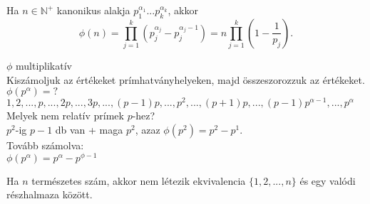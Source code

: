 \documentclass{beamer}
\begin{document}
\begin{frame}

\begin{tcolorbox}[title={Tétel: ${\phi}$(n) kiszámolása}]
Ha $n \in \mathbb{N}^+$ kanonikus alakja $p_1^{{\alpha}_1}...p_k^{{\alpha}_k}$, akkor\\
$${\phi}(n) = \prod^k_{j=1} (p_j^{{\alpha}_j} - p_j^{{\alpha}_j - 1}) = n \prod^k_{j=1} (1 - \frac{1}{p_j}).$$
\end{tcolorbox}

\begin{tcolorbox}[title={Bizonyítás}]
$\phi$ multiplikatív\\
Kiszámoljuk az értékeket prímhatványhelyeken, majd összeszorozzuk az értékeket.\\
${\phi}(p^{\alpha}) = ?$\\
$1, 2, ..., p, ..., 2p, ..., 3p, ..., (p-1)p, ..., p^2, ..., (p+1)p, ..., (p-1)p^{{\alpha}-1}, ..., p^{\alpha}$\\
Melyek nem relatív prímek $p$-hez?\\
\smallskip
$p^2$-ig $p - 1$ db van + maga $p^2$, azaz ${\phi}(p^2) = p^2 - p^1$.\\
Tovább számolva:\\
${\phi}(p^{\alpha}) = p^{\alpha} - p^{\phi - 1}$

\end{tcolorbox}

\end{frame}

\begin{frame}[plain]
\end{frame}

\begin{frame}

\begin{tcolorbox}[title={Tétel: Véges halmaz valódi részhalmaza}]
Ha $n$ természetes szám, akkor nem létezik ekvivalencia $\{1, 2, ..., n\}$ és egy valódi részhalmaza között.	

\end{tcolorbox}

\end{frame}
\end{document}
